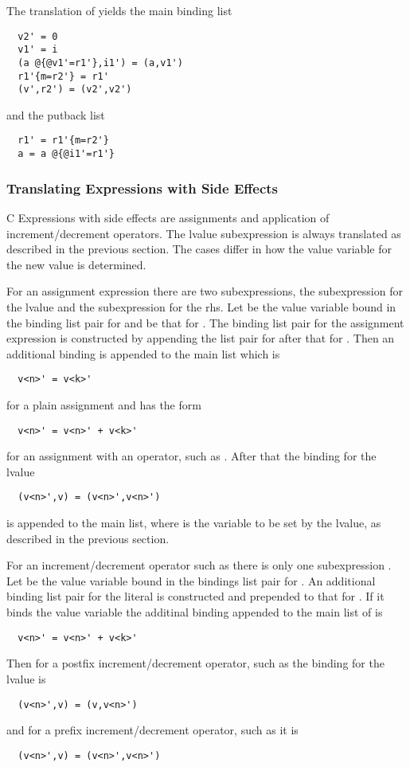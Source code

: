 The translation of  yields the main binding list
\begin{verbatim}
  v2' = 0
  v1' = i
  (a @{@v1'=r1'},i1') = (a,v1')
  r1'{m=r2'} = r1'
  (v',r2') = (v2',v2')
\end{verbatim}
and the putback list
\begin{verbatim}
  r1' = r1'{m=r2'}
  a = a @{@i1'=r1'}
\end{verbatim}

\subsubsection{Translating Expressions with Side Effects}

C Expressions with side effects are assignments and application of increment/decrement operators. The lvalue subexpression is always 
translated as described in the previous section. The cases differ in how the value variable  for the new value is 
determined.

For an assignment expression there are two subexpressions, the subexpression  for the lvalue and the subexpression 
for the rhs. Let  be the value variable bound in the binding list pair for  and  be that for .
The binding list pair for the assignment expression is constructed by appending the list pair for  after that for .
Then an additional binding is appended to the main list which is
\begin{verbatim}
  v<n>' = v<k>'
\end{verbatim}
for a plain assignment  and has the form
\begin{verbatim}
  v<n>' = v<n>' + v<k>'
\end{verbatim}
for an assignment with an operator, such as . After that the binding for the lvalue 
\begin{verbatim}
  (v<n>',v) = (v<n>',v<n>')
\end{verbatim}
is appended to the main list, where  is the variable to be set by the lvalue, as described in the previous section.

For an increment/decrement operator such as  there is only one subexpression . Let  be the value variable bound in 
the bindings list pair for . An additional binding list pair for the literal  is constructed and prepended to that for .
If it binds the value variable  the additinal binding appended to the main list of  is
\begin{verbatim}
  v<n>' = v<n>' + v<k>'
\end{verbatim}
Then for a postfix increment/decrement operator, such as  the binding for the lvalue is
\begin{verbatim}
  (v<n>',v) = (v,v<n>')
\end{verbatim}
and for a prefix increment/decrement operator, such as  it is
\begin{verbatim}
  (v<n>',v) = (v<n>',v<n>')
\end{verbatim}

